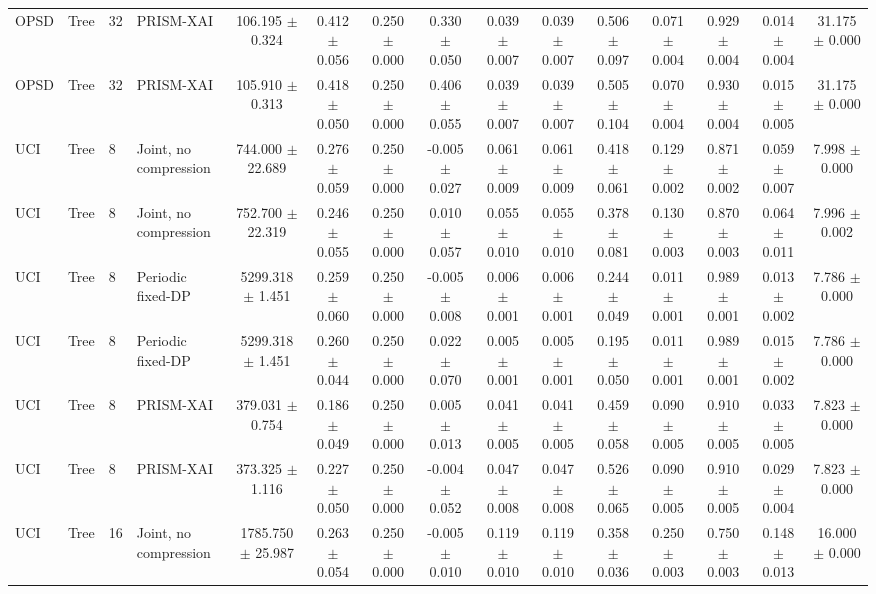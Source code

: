 \begin{table}[t]
\begin{tabular}{llllccccccccccc}
OPSD & Tree & 32 & PRISM-XAI & 106.195 $\pm$ 0.324 & 0.412 $\pm$ 0.056 & 0.250 $\pm$ 0.000 & 0.330 $\pm$ 0.050 & 0.039 $\pm$ 0.007 & 0.039 $\pm$ 0.007 & 0.506 $\pm$ 0.097 & 0.071 $\pm$ 0.004 & 0.929 $\pm$ 0.004 & 0.014 $\pm$ 0.004 & 31.175 $\pm$ 0.000 \\
OPSD & Tree & 32 & PRISM-XAI & 105.910 $\pm$ 0.313 & 0.418 $\pm$ 0.050 & 0.250 $\pm$ 0.000 & 0.406 $\pm$ 0.055 & 0.039 $\pm$ 0.007 & 0.039 $\pm$ 0.007 & 0.505 $\pm$ 0.104 & 0.070 $\pm$ 0.004 & 0.930 $\pm$ 0.004 & 0.015 $\pm$ 0.005 & 31.175 $\pm$ 0.000 \\
UCI & Tree & 8 & Joint, no compression & 744.000 $\pm$ 22.689 & 0.276 $\pm$ 0.059 & 0.250 $\pm$ 0.000 & -0.005 $\pm$ 0.027 & 0.061 $\pm$ 0.009 & 0.061 $\pm$ 0.009 & 0.418 $\pm$ 0.061 & 0.129 $\pm$ 0.002 & 0.871 $\pm$ 0.002 & 0.059 $\pm$ 0.007 & 7.998 $\pm$ 0.000 \\
UCI & Tree & 8 & Joint, no compression & 752.700 $\pm$ 22.319 & 0.246 $\pm$ 0.055 & 0.250 $\pm$ 0.000 & 0.010 $\pm$ 0.057 & 0.055 $\pm$ 0.010 & 0.055 $\pm$ 0.010 & 0.378 $\pm$ 0.081 & 0.130 $\pm$ 0.003 & 0.870 $\pm$ 0.003 & 0.064 $\pm$ 0.011 & 7.996 $\pm$ 0.002 \\
UCI & Tree & 8 & Periodic fixed-DP & 5299.318 $\pm$ 1.451 & 0.259 $\pm$ 0.060 & 0.250 $\pm$ 0.000 & -0.005 $\pm$ 0.008 & 0.006 $\pm$ 0.001 & 0.006 $\pm$ 0.001 & 0.244 $\pm$ 0.049 & 0.011 $\pm$ 0.001 & 0.989 $\pm$ 0.001 & 0.013 $\pm$ 0.002 & 7.786 $\pm$ 0.000 \\
UCI & Tree & 8 & Periodic fixed-DP & 5299.318 $\pm$ 1.451 & 0.260 $\pm$ 0.044 & 0.250 $\pm$ 0.000 & 0.022 $\pm$ 0.070 & 0.005 $\pm$ 0.001 & 0.005 $\pm$ 0.001 & 0.195 $\pm$ 0.050 & 0.011 $\pm$ 0.001 & 0.989 $\pm$ 0.001 & 0.015 $\pm$ 0.002 & 7.786 $\pm$ 0.000 \\
UCI & Tree & 8 & PRISM-XAI & 379.031 $\pm$ 0.754 & 0.186 $\pm$ 0.049 & 0.250 $\pm$ 0.000 & 0.005 $\pm$ 0.013 & 0.041 $\pm$ 0.005 & 0.041 $\pm$ 0.005 & 0.459 $\pm$ 0.058 & 0.090 $\pm$ 0.005 & 0.910 $\pm$ 0.005 & 0.033 $\pm$ 0.005 & 7.823 $\pm$ 0.000 \\
UCI & Tree & 8 & PRISM-XAI & 373.325 $\pm$ 1.116 & 0.227 $\pm$ 0.050 & 0.250 $\pm$ 0.000 & -0.004 $\pm$ 0.052 & 0.047 $\pm$ 0.008 & 0.047 $\pm$ 0.008 & 0.526 $\pm$ 0.065 & 0.090 $\pm$ 0.005 & 0.910 $\pm$ 0.005 & 0.029 $\pm$ 0.004 & 7.823 $\pm$ 0.000 \\
UCI & Tree & 16 & Joint, no compression & 1785.750 $\pm$ 25.987 & 0.263 $\pm$ 0.054 & 0.250 $\pm$ 0.000 & -0.005 $\pm$ 0.010 & 0.119 $\pm$ 0.010 & 0.119 $\pm$ 0.010 & 0.358 $\pm$ 0.036 & 0.250 $\pm$ 0.003 & 0.750 $\pm$ 0.003 & 0.148 $\pm$ 0.013 & 16.000 $\pm$ 0.000 \\

\end{tabular}
\end{table}
